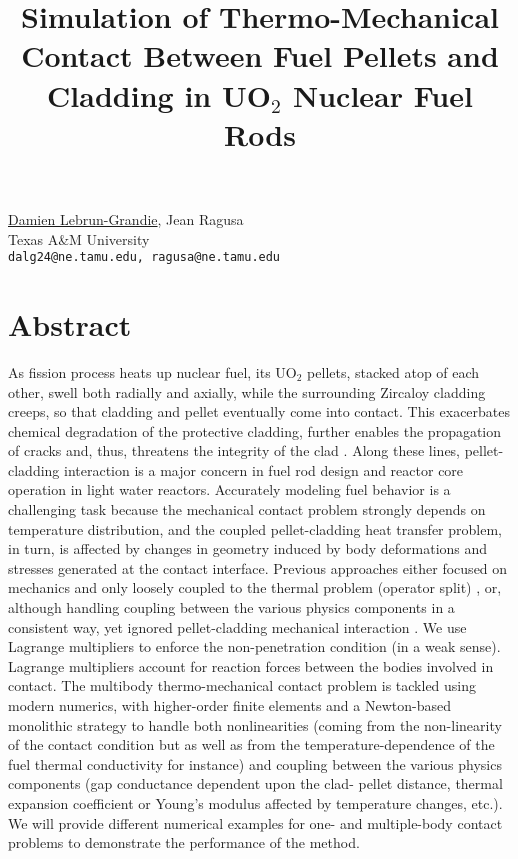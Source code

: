 \title{Simulation of Thermo-Mechanical Contact Between Fuel Pellets and Cladding in UO$_2$ Nuclear Fuel Rods}
 \author{} \institute{}
\maketitle
\begin{center}
{\large \underline{Damien Lebrun-Grandie}, Jean Ragusa}\\
Texas A\&M University\\
{\tt dalg24@ne.tamu.edu, ragusa@ne.tamu.edu}

\end{center}

\section*{Abstract}

As fission process heats up nuclear fuel, its UO$_2$ pellets, stacked atop of each other, swell both radially and axially, while the surrounding Zircaloy cladding creeps, so that cladding and pellet eventually come into contact.
This exacerbates chemical degradation of the protective cladding, further enables the propagation of cracks and, thus, threatens the integrity of the clad \cite{Aas1972}.
Along these lines, pellet-cladding interaction is a major concern in fuel rod design and reactor core operation in light water reactors.
Accurately modeling fuel behavior is a challenging task because the mechanical contact problem strongly depends on temperature distribution,
and the coupled pellet-cladding heat transfer problem, in turn, is affected by changes in geometry induced by body deformations and stresses generated at the contact interface.
Previous approaches either focused on mechanics and only loosely coupled to the thermal problem (operator split) \cite{Denis2003},
or, although handling coupling between the various physics components in a consistent way, yet ignored pellet-cladding mechanical interaction \cite{Mihaila2009,Newman2009}.
We use Lagrange multipliers to enforce the non-penetration condition (in a weak sense).  Lagrange multipliers account for reaction forces between the bodies involved in contact.
The multibody thermo-mechanical contact problem is tackled using modern numerics, with higher-order finite elements and a Newton-based monolithic strategy \cite{Solin2010} to handle both nonlinearities
(coming from the non-linearity of the contact condition but as well as from the temperature-dependence of the fuel thermal conductivity for instance)
and coupling between the various physics components (gap conductance dependent upon the clad- pellet distance, thermal expansion coefficient or Young's modulus affected by temperature changes, etc.).
We will provide different numerical examples for one- and multiple-body contact problems to demonstrate the performance of the method.

